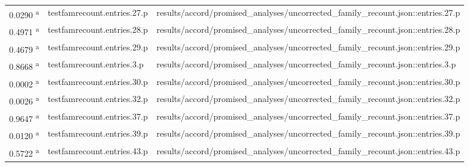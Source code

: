 \begin{longtable}{@{}p{0.7in}p{1.9in}p{2.6in}@{}}
0.0290 \textsuperscript{a} & testfamrecount.\allowbreak{}entries.\allowbreak{}27.\allowbreak{}p & results/\allowbreak{}accord/\allowbreak{}promised\_analyses/\allowbreak{}uncorrected\_family\_recount.\allowbreak{}json::entries.\allowbreak{}27.\allowbreak{}p\\
0.4971 \textsuperscript{a} & testfamrecount.\allowbreak{}entries.\allowbreak{}28.\allowbreak{}p & results/\allowbreak{}accord/\allowbreak{}promised\_analyses/\allowbreak{}uncorrected\_family\_recount.\allowbreak{}json::entries.\allowbreak{}28.\allowbreak{}p\\
0.4679 \textsuperscript{a} & testfamrecount.\allowbreak{}entries.\allowbreak{}29.\allowbreak{}p & results/\allowbreak{}accord/\allowbreak{}promised\_analyses/\allowbreak{}uncorrected\_family\_recount.\allowbreak{}json::entries.\allowbreak{}29.\allowbreak{}p\\
0.8668 \textsuperscript{a} & testfamrecount.\allowbreak{}entries.\allowbreak{}3.\allowbreak{}p & results/\allowbreak{}accord/\allowbreak{}promised\_analyses/\allowbreak{}uncorrected\_family\_recount.\allowbreak{}json::entries.\allowbreak{}3.\allowbreak{}p\\
0.0002 \textsuperscript{a} & testfamrecount.\allowbreak{}entries.\allowbreak{}30.\allowbreak{}p & results/\allowbreak{}accord/\allowbreak{}promised\_analyses/\allowbreak{}uncorrected\_family\_recount.\allowbreak{}json::entries.\allowbreak{}30.\allowbreak{}p\\
0.0026 \textsuperscript{a} & testfamrecount.\allowbreak{}entries.\allowbreak{}32.\allowbreak{}p & results/\allowbreak{}accord/\allowbreak{}promised\_analyses/\allowbreak{}uncorrected\_family\_recount.\allowbreak{}json::entries.\allowbreak{}32.\allowbreak{}p\\
0.9647 \textsuperscript{a} & testfamrecount.\allowbreak{}entries.\allowbreak{}37.\allowbreak{}p & results/\allowbreak{}accord/\allowbreak{}promised\_analyses/\allowbreak{}uncorrected\_family\_recount.\allowbreak{}json::entries.\allowbreak{}37.\allowbreak{}p\\
0.0120 \textsuperscript{a} & testfamrecount.\allowbreak{}entries.\allowbreak{}39.\allowbreak{}p & results/\allowbreak{}accord/\allowbreak{}promised\_analyses/\allowbreak{}uncorrected\_family\_recount.\allowbreak{}json::entries.\allowbreak{}39.\allowbreak{}p\\
0.5722 \textsuperscript{a} & testfamrecount.\allowbreak{}entries.\allowbreak{}43.\allowbreak{}p & results/\allowbreak{}accord/\allowbreak{}promised\_analyses/\allowbreak{}uncorrected\_family\_recount.\allowbreak{}json::entries.\allowbreak{}43.\allowbreak{}p\\

\end{longtable}
